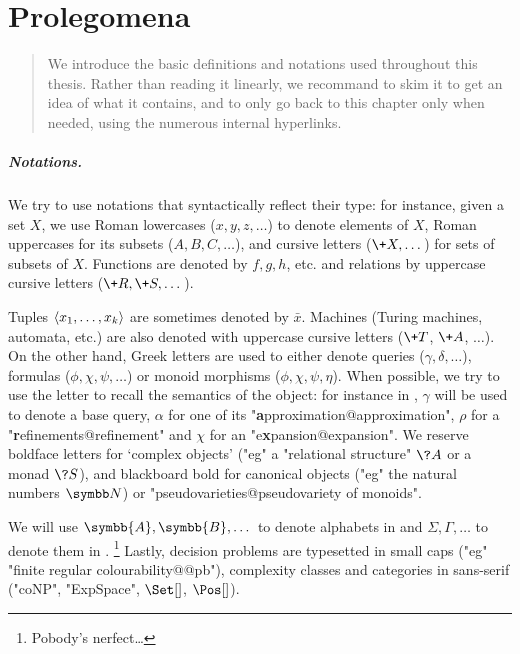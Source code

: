 \chapter{Prolegomena}
\label{ch:general-preliminaries}
\renewcommand\thefigure{\thechapter.\arabic{figure}}

\begin{chapterpresentation}
	\begin{abstract}
		We introduce the basic definitions and notations used throughout this thesis.
		Rather than reading it linearly, we recommand to skim it
		to get an idea of what it contains, and to only go back to this chapter
		only when needed, using the numerous internal hyperlinks.
	\end{abstract}
		
	\par\bigskip\bigskip
	\chaptertoc
\end{chapterpresentation}

\paragraph*{Notations.}
We try to use notations that syntactically reflect their type:
for instance, given a set $X$, we use Roman lowercases ($x,y,z,\dotsc$)
to denote elements of $X$, Roman uppercases for its subsets ($A, B, C, \dotsc$),
and cursive letters ($\+X, \dotsc$) for sets of subsets of $X$.
Functions are denoted by $f, g, h$, etc. and relations by
uppercase cursive letters ($\+R, \+S, \dotsc$).

Tuples $\langle x_1,\dotsc,x_k\rangle$ are sometimes denoted by $\bar x$.
Machines (Turing machines, automata, etc.) are also denoted
with uppercase cursive letters ($\+T$, $\+A$, $\dotsc$).
On the other hand, Greek letters are used to either denote queries ($\gamma, \delta, \dotsc$),
formulas ($\phi, \chi, \psi, \dotsc$) or monoid morphisms ($\phi, \chi, \psi, \eta$). When possible, we try to
use the letter to recall the semantics of the object: for instance in
, $\gamma$ will be used to denote a base query,
$\alpha$ for one of its "\textbf{a}pproximation@approximation",
$\rho$ for a "\textbf{r}efinements@refinement" and
$\chi$ for an "e\textbf{x}pansion@expansion".
We reserve boldface letters for `complex objects' ("eg"
a "relational structure" $\?A$ or a monad $\?S$), and blackboard bold
for canonical objects ("eg" the natural numbers $\N$) or "pseudovarieties@pseudovariety of monoids".

We will use $\symbb{A}, \symbb{B}, \dotsc$ to denote
alphabets in  and $\Sigma, \Gamma, \dotsc$
to denote them in .%
\footnote{Pobody's nerfect…}
Lastly, decision problems are typesetted in small caps
("eg" "finite regular colourability@@pb"), 
complexity classes and categories in sans-serif ("coNP", "ExpSpace", $\Set[]$,
$\Pos[]$).


